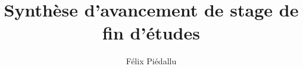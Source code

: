 \documentclass[a4paper,11pt]{report}
\title{Synthèse d'avancement de stage de fin d'études}
\author{Félix Piédallu}
\begin{document}
\maketitle
\tableofcontents

\begin{abstract}
\end{abstract}

\chapter{}
\end{document}
